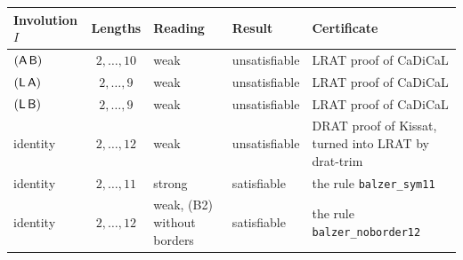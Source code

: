 \begin{tabular}{@{}lcll>{\raggedright\arraybackslash}p{}@{}}
\toprule
Involution $I$ & Lengths & Reading & Result & Certificate\\
\midrule
$(\mathsf A\,\mathsf B)$ & $2,\dots,10$ & weak & unsatisfiable & LRAT proof of CaDiCaL\\
$(\mathsf L\,\mathsf A)$ & $2,\dots,9$ & weak & unsatisfiable & LRAT proof of CaDiCaL\\
$(\mathsf L\,\mathsf B)$ & $2,\dots,9$ & weak & unsatisfiable & LRAT proof of CaDiCaL\\
identity & $2,\dots,12$ & weak & unsatisfiable & DRAT proof of Kissat, turned into LRAT by \textsf{drat-trim}\\
identity & $2,\dots,11$ & strong & satisfiable & the rule \texttt{balzer\_sym11}\\
identity & $2,\dots,12$ & weak, (B2) without borders & satisfiable & the rule \texttt{balzer\_noborder12}\\
\bottomrule
\end{tabular}
